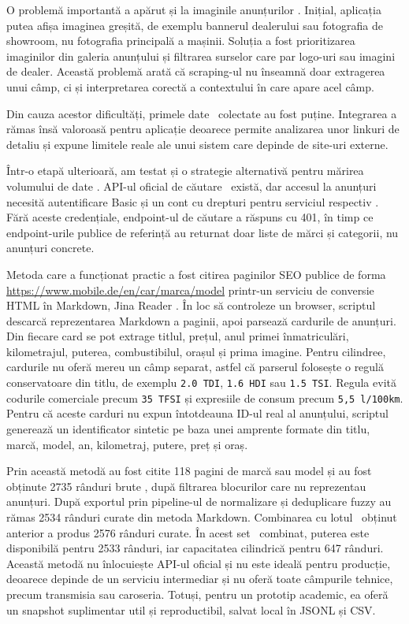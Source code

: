 O problemă importantă a apărut și la imaginile anunțurilor \mobilede. Inițial, aplicația putea afișa imaginea greșită, de exemplu bannerul dealerului sau fotografia de showroom, nu fotografia principală a mașinii. Soluția a fost prioritizarea imaginilor din galeria anunțului și filtrarea surselor care par logo-uri sau imagini de dealer. Această problemă arată că scraping-ul nu înseamnă doar extragerea unui câmp, ci și interpretarea corectă a contextului în care apare acel câmp.

Din cauza acestor dificultăți, primele date \mobilede\ colectate au fost puține. Integrarea a rămas însă valoroasă pentru aplicație deoarece permite analizarea unor linkuri de detaliu și expune limitele reale ale unui sistem care depinde de site-uri externe.

Într-o etapă ulterioară, am testat și o strategie alternativă pentru mărirea volumului de date \mobilede. API-ul oficial de căutare \mobilede\ există, dar accesul la anunțuri necesită autentificare Basic și un cont cu drepturi pentru serviciul respectiv \cite{mobilede_search_api}. Fără aceste credențiale, endpoint-ul de căutare a răspuns cu 401, în timp ce endpoint-urile publice de referință au returnat doar liste de mărci și categorii, nu anunțuri concrete.

Metoda care a funcționat practic a fost citirea paginilor SEO publice de forma \url{https://www.mobile.de/en/car/marca/model} printr-un serviciu de conversie HTML în Markdown, Jina Reader \cite{jina_reader}. În loc să controleze un browser, scriptul descarcă reprezentarea Markdown a paginii, apoi parsează cardurile de anunțuri. Din fiecare card se pot extrage titlul, prețul, anul primei înmatriculări, kilometrajul, puterea, combustibilul, orașul și prima imagine. Pentru cilindree, cardurile nu oferă mereu un câmp separat, astfel că parserul folosește o regulă conservatoare din titlu, de exemplu \texttt{2.0 TDI}, \texttt{1.6 HDI} sau \texttt{1.5 TSI}. Regula evită codurile comerciale precum \texttt{35 TFSI} și expresiile de consum precum \texttt{5,5 l/100km}. Pentru că aceste carduri nu expun întotdeauna ID-ul real al anunțului, scriptul generează un identificator sintetic pe baza unei amprente formate din titlu, marcă, model, an, kilometraj, putere, preț și oraș.

Prin această metodă au fost citite 118 pagini de marcă sau model și au fost obținute 2735 rânduri brute \mobilede, după filtrarea blocurilor care nu reprezentau anunțuri. După exportul prin pipeline-ul de normalizare și deduplicare fuzzy au rămas 2534 rânduri curate din metoda Markdown. Combinarea cu lotul \mobilede\ obținut anterior a produs 2576 rânduri curate. În acest set \mobilede\ combinat, puterea este disponibilă pentru 2533 rânduri, iar capacitatea cilindrică pentru 647 rânduri. Această metodă nu înlocuiește API-ul oficial și nu este ideală pentru producție, deoarece depinde de un serviciu intermediar și nu oferă toate câmpurile tehnice, precum transmisia sau caroseria. Totuși, pentru un prototip academic, ea oferă un snapshot suplimentar util și reproductibil, salvat local în JSONL și CSV.

